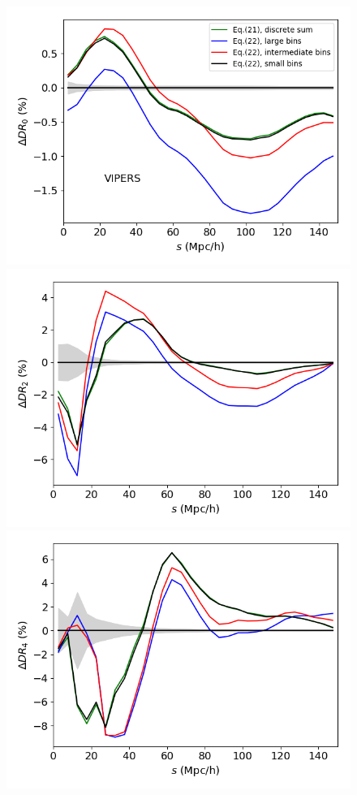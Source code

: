 \documentclass{aa}
\begin{document}
\begin{figure}
\includegraphics[width=0.96\columnwidth]{Figures/reldif_DR_random_VIPERS_W1_nside65536_N_3900000_1e-5_l0} 
\includegraphics[width=0.96\columnwidth]{Figures/reldif_DR_random_VIPERS_W1_nside65536_N_3900000_1e-5_l2} 
\includegraphics[width=0.96\columnwidth]{Figures/reldif_DR_random_VIPERS_W1_nside65536_N_3900000_1e-5_l4} 

\end{figure}
\end{document}
